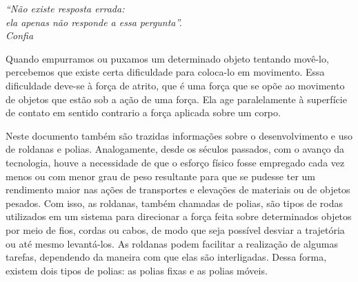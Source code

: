 

	\begin{flushright}
		\textit{``Não existe resposta errada: \\ ela apenas não responde a essa pergunta''.\\
		Confia}
	\end{flushright}
	
	Quando empurramos ou puxamos um determinado objeto tentando movê-lo, percebemos que existe certa dificuldade para coloca-lo em movimento. Essa dificuldade deve-se à força de atrito, que é uma força que se opõe ao movimento de objetos que estão sob a ação de uma força. Ela age paralelamente à superfície de contato em sentido contrario a força aplicada sobre um corpo\cite{da2019estudo}.
	
	Neste documento também são trazidas informações sobre o desenvolvimento e uso de roldanas e polias. Analogamente, desde os séculos passados, com o avanço da tecnologia, houve a necessidade de que o esforço físico fosse empregado cada vez menos ou com menor grau de peso resultante para que se pudesse ter um rendimento maior nas ações de transportes e elevações de materiais ou de objetos pesados. Com isso, as roldanas, também chamadas de polias, são tipos de rodas utilizados em um sistema para direcionar a força feita sobre determinados objetos por meio de fios, cordas ou cabos, de modo que seja possível desviar a trajetória ou até mesmo levantá-los. As roldanas podem facilitar a realização de algumas tarefas, dependendo da maneira com que elas são interligadas. Dessa forma, existem dois tipos de polias: as polias fixas e as polias móveis\cite{site1}.